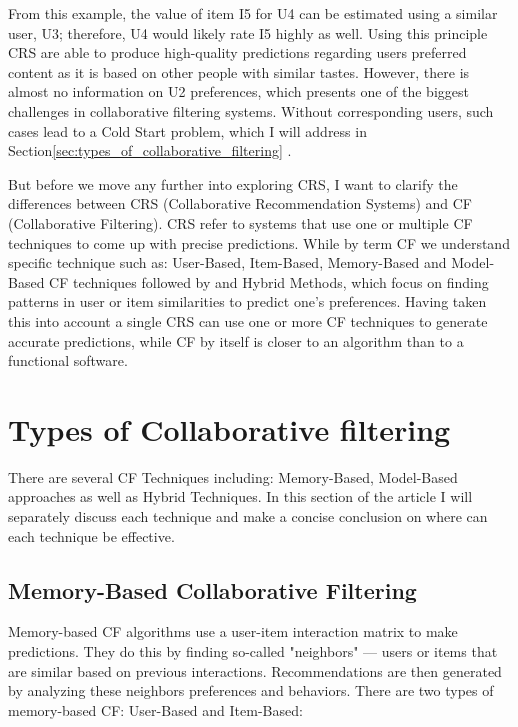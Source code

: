 \documentclass[10pt,a4paper]{article}
\begin{document}
\hspace{0.2cm}

From this example, the value of item I5 for U4 can be estimated using a similar user, U3; therefore, U4 would likely rate I5 highly as well. Using this principle CRS are able to produce high-quality predictions regarding users preferred content as it is based on other people with similar tastes. However, there is almost no information on U2 preferences, which presents one of the biggest challenges in collaborative filtering systems. Without corresponding users, such cases lead to a Cold Start problem, which I will address in Section\ref{sec:types_of_collaborative_filtering} \cite{5283866}.

\hspace{0.2cm}

But before we move any further into exploring CRS, I want to clarify the differences between CRS (Collaborative Recommendation Systems) and CF (Collaborative Filtering). CRS refer to systems that use one or multiple CF techniques to come up with precise predictions. While by term CF we understand specific technique such as: User-Based, Item-Based, Memory-Based and Model-Based CF techniques followed by and Hybrid Methods, which focus on finding patterns in user or item similarities to predict one's preferences. Having taken this into account a single CRS can use one or more CF techniques to generate accurate predictions, while CF by itself is closer to an algorithm than to a functional software.


\section{Types of Collaborative filtering}

There are several CF Techniques including: Memory-Based, Model-Based approaches as well as Hybrid Techniques. In this section of the article I will separately discuss each technique and make a concise conclusion on where can each technique be effective.

\subsection{Memory-Based Collaborative Filtering}
Memory-based CF algorithms use a user-item interaction matrix to make predictions. They do this by finding so-called "neighbors" — users or items that are similar based on previous interactions. Recommendations are then generated by analyzing these neighbors preferences and behaviors. There are two types of memory-based CF: User-Based and Item-Based:
\end{document}
